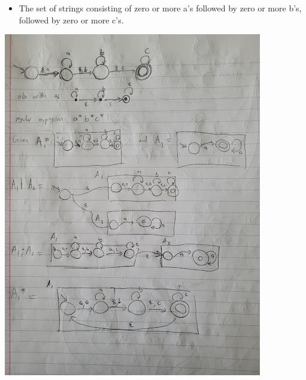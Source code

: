 \documentclass{article}
\theoremstyle{theorem}
\theoremstyle{definition}
\theoremstyle{remark}
\begin{document}
\begin{itemize}
    \item The set of strings consisting of zero or more a's followed by zero or more b's, followed by zero or more c's.
\end{itemize}
\includegraphics{Report Images/HW11_5.jpg}
\end{document}
